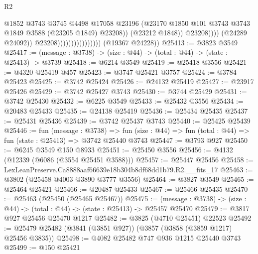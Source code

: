 \begin{lexlean}{R2}
\begin{coremodule}
                                                    @1852
                                                    @3743
                                                    @3745
                                                    @4498
                                                    @17058
                                                    @23196
                                                    (@23170
                                                      @1850
                                                      @101
                                                      @3743
                                                      @3743
                                                      @1849
                                                      @3588
                                                      (@23205 @1849)
                                                      @23208))
                                                  (@23212 @1848))
                                                @23208))))
                                        (@24289 @24092))
                                      @23208))))))))))))))))
      (@19367 @24228))
@25413 := @3823 @3549
@25417 := (message : @3738) -> (size : @44) -> (total : @44) -> (state : @25413) -> @3739
@25418 := @6214 @3549
@25419 := @25418 @3556
@25421 := @4320 @25419 @457
@25423 := @3747 @25421 @3757
@25424 := @3784 @25423
@25425 := @3742 @25424
@25426 := @24132 @25419
@25427 := @23917 @25426
@25429 := @3742 @25427 @3743
@25430 := @3744 @25429
@25431 := @3742 @25430
@25432 := @6225 @3549
@25433 := @25432 @3556
@25434 := @20483 @25433
@25435 := @24138 @25419
@25436 := @25434 @25435
@25437 := @25431 @25436
@25439 := @3742 @25437 @3743
@25440 := @25425 @25439
@25446 := fun (message : @3738) =>
  fun (size : @44) => fun (total : @44) => fun (state : @25413) => @3742 @25440 @3743
@25447 := @3793 @927
@25450 := @6245 @3549 @150 @8933
@25451 := @25450 @3556
@25456 := @4132 (@12339 (@6086 (@3554 @25451 @3588)))
@25457 := @25447 @25456
@25458 := LexLeanPreserve.Ca8888aaf66639e18b304b8df68dd1b79.R2.__fits_17
@25463 := @3802 (@25458 @4003 @3890 @3777 @3556)
@25464 := @3827 @3549
@25465 := @25464 @25421
@25466 := @20487 @25433
@25467 := @25466 @25435
@25470 := @25463 (@25450 (@25465 @25467))
@25475 := (message : @3738) -> (size : @44) -> (total : @44) -> (state : @25413) -> @25457 @25470
@25479 := @3817 @927 @25456 @25470 @1217
@25482 := @3825 (@4710 @25451) @22523
@25492 := @25479 @25482 (@3841 (@3851 @927)) (@3857 (@3858 (@3859 @1217) @25456 @3835))
@25498 := @4082 @25482 @747 @936 @1215 @25440 @3743
@25499 := @150 @25421

\end{coremodule}
\end{lexlean}
